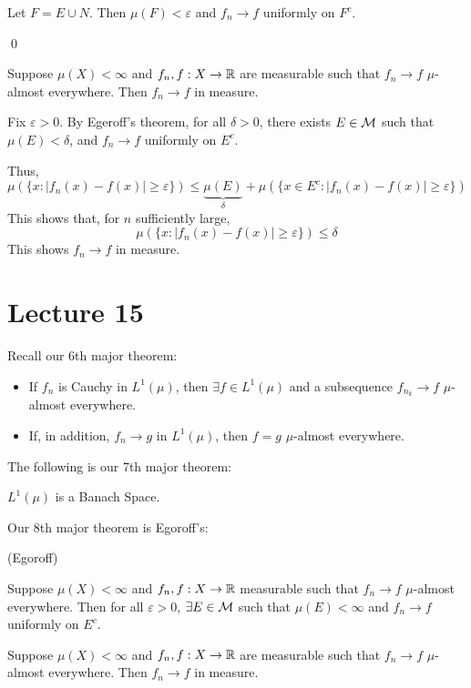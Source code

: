 \documentclass[x11names,reqno,14pt]{extarticle}
\newcommand*{\oo}{\infty}
\begin{document}
Let $F = E \cup N$. Then $\mu(F) < \varepsilon$ and $f_n \to f$ uniformly on $F^c$. 

\qed

\cor

Suppose $\mu(X) < \oo$ and $f_n, f:X\to\mathbb{R}$ are measurable such that $f_n\to f$ $\mu$-almost everywhere. Then $f_n \to f$ in measure. 

\proof

Fix $\varepsilon> 0$. By Egeroff's theorem, for all $\delta>0$, there exists $E \in \mathcal{M}$ such that $\mu(E)<\delta$, and $f_n \to f$ uniformly on $E^c$. 

Thus, 
\[
\mu(\{x: |f_n(x) - f(x)| \geq \varepsilon\}) \leq \underbrace{\mu(E)}_{\delta} + \mu(\{x\in E^c: |f_n(x) - f(x)| \geq \varepsilon\})
\]
This shows that, for $n$ sufficiently large, 
\[
\mu(\{x: |f_n(x) - f(x)| \geq \varepsilon\}) \leq \delta
\]
This shows $f_n \to f$ in measure. 

\section*{Lecture 15}

Recall our 6th major theorem: 

\cor

\begin{itemize}
\item If $f_n$ is Cauchy in $L^1(\mu)$, then $\exists f \in L^1(\mu)$ and a subsequence $f_{n_k}\to f$ $\mu$-almost everywhere. 
\item If, in addition, $f_n\to g$ in $L^1(\mu)$, then $f = g$ $\mu$-almost everywhere. 
\end{itemize}

The following is our 7th major theorem:

\cor 

$L^1(\mu)$ is a Banach Space.

Our 8th major theorem is Egoroff's:

\thm (Egoroff)

Suppose $\mu(X)<\oo$ and $f_n, f:X\to\mathbb{R}$ measurable such that $f_n\to f$ $\mu$-almost everywhere. Then for all $\varepsilon>0$, $\exists E \in \mathcal{M}$ such that $\mu(E)<\oo$ and $f_n \to f$ uniformly on $E^c$. 

\cor

Suppose $\mu(X)<\oo$ and $f_n, f:X\to\mathbb{R}$ are measurable such that $f_n \to f$ $\mu$-almost everywhere. Then $f_n \to f$ in measure. 
\end{document}
